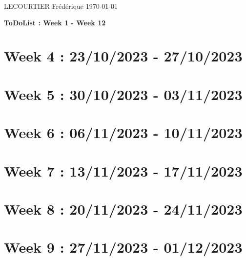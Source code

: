\documentclass{article}
\begin{document}
	LECOURTIER Frédérique \hfill \today
	\begin{center}
		\Large\textbf{{ToDoList : Week 1 - Week 12}}
	\end{center}
	\tableofcontents

	\newpage

	\section*{Week 4 : 23/10/2023 - 27/10/2023}
	

	\newpage

	\section*{Week 5 : 30/10/2023 - 03/11/2023}
	

	\newpage

	\section*{Week 6 : 06/11/2023 - 10/11/2023}
	

	\newpage

	\section*{Week 7 : 13/11/2023 - 17/11/2023}
	

	\newpage

	\section*{Week 8 : 20/11/2023 - 24/11/2023}
	

	\newpage

	\section*{Week 9 : 27/11/2023 - 01/12/2023}
	

	\newpage
\end{document}
